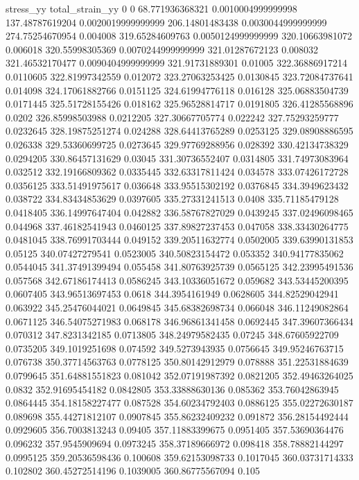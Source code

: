 stress_yy total_strain_yy
0 0
68.771936368321 0.0010004999999998
137.48787619204 0.0020019999999999
206.14801483438 0.0030044999999999
274.75254670954 0.004008
319.65284609763 0.0050124999999999
320.10663981072 0.006018
320.55998305369 0.0070244999999999
321.01287672123 0.008032
321.46532170477 0.0090404999999999
321.91731889301 0.01005
322.36886917214 0.0110605
322.81997342559 0.012072
323.27063253425 0.0130845
323.72084737641 0.014098
324.17061882766 0.0151125
324.61994776118 0.016128
325.06883504739 0.0171445
325.51728155426 0.018162
325.96528814717 0.0191805
326.41285568896 0.0202
326.85998503988 0.0212205
327.30667705774 0.022242
327.75293259777 0.0232645
328.19875251274 0.024288
328.64413765289 0.0253125
329.08908886595 0.026338
329.53360699725 0.0273645
329.97769288956 0.028392
330.42134738329 0.0294205
330.86457131629 0.03045
331.30736552407 0.0314805
331.74973083964 0.032512
332.19166809362 0.0335445
332.63317811424 0.034578
333.07426172728 0.0356125
333.51491975617 0.036648
333.95515302192 0.0376845
334.3949623432 0.038722
334.83434853629 0.0397605
335.27331241513 0.0408
335.71185479128 0.0418405
336.14997647404 0.042882
336.58767827029 0.0439245
337.02496098465 0.044968
337.46182541943 0.0460125
337.89827237453 0.047058
338.33430264775 0.0481045
338.76991703444 0.049152
339.20511632774 0.0502005
339.63990131853 0.05125
340.07427279541 0.0523005
340.50823154472 0.053352
340.94177835062 0.0544045
341.37491399494 0.055458
341.80763925739 0.0565125
342.23995491536 0.057568
342.67186174413 0.0586245
343.10336051672 0.059682
343.53445200395 0.0607405
343.96513697453 0.0618
344.3954161949 0.0628605
344.82529042941 0.063922
345.25476044021 0.0649845
345.68382698734 0.066048
346.11249082864 0.0671125
346.54075271983 0.068178
346.96861341458 0.0692445
347.39607366434 0.070312
347.8231342185 0.0713805
348.24979582435 0.07245
348.67605922709 0.0735205
349.1019251698 0.074592
349.5273943935 0.0756645
349.95246763715 0.076738
350.37714563763 0.0778125
350.80142912979 0.078888
351.22531884639 0.0799645
351.64881551823 0.081042
352.07191987392 0.0821205
352.49463264025 0.0832
352.91695454182 0.0842805
353.33888630136 0.085362
353.76042863945 0.0864445
354.18158227477 0.087528
354.60234792403 0.0886125
355.02272630187 0.089698
355.44271812107 0.0907845
355.86232409232 0.091872
356.28154492444 0.0929605
356.7003813243 0.09405
357.11883399675 0.0951405
357.53690364476 0.096232
357.9545909694 0.0973245
358.37189666972 0.098418
358.78882144297 0.0995125
359.20536598436 0.100608
359.62153098733 0.1017045
360.03731714333 0.102802
360.45272514196 0.1039005
360.86775567094 0.105
